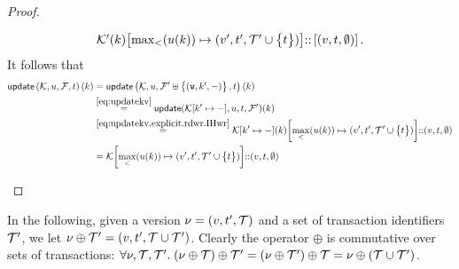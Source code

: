 \begin{proof}
\begin{enumerate}
\begin{itemize}
\begin{equation}
\begin{array}{l}
            \mkvs'(\key)\rmto{\max_{<}(\vi(\key))}{(\val', \txid', \txidset' \cup \Set{\txid})} \lcat \List{(\val, \txid, \emptyset)}.
            \end{array}
			\end{equation}
			It follows that 
            \begin{align*}
			    \updateKV[\mkvs, \vi, \fp, \txid](\key)
                & =
                \updateKV[\mkvs, \vi, \fp' \uplus \Set{(\otW, \key', \stub)}, \txid](\key) \\
                & \stackrel{\cref{eq:updatekv}}{=} 
			    \updateKV(\mkvs\rmto{\key'}{\stub}, \vi, \txid, \fp')(\key) \\
                & \stackrel{\cref{eq:updatekv.explicit.rdwr.IHwr}}{=}
                \mkvs\rmto{\key'}{\stub}(\key)\rmto{\max_{<}(\vi(\key))}{(\val', \txid', \txidset' \cup \Set{\txid})} \lcat (\val, \txid, \emptyset) \\
                & =
                \mkvs\rmto{\max_{<}(\vi(\key))}{(\val', \txid', \txidset' \cup \Set{\txid})} \lcat (\val, \txid, \emptyset)
            \end{align*}
			\end{itemize}
\end{enumerate}
\end{proof}

In the following, given a version $\nu = (v, t', \mathcal{T})$ and a set of 
transaction identifiers $\mathcal{T}'$, we let $\nu \oplus \mathcal{T}' = (v, t', \mathcal{T} \cup \mathcal{T}')$. 
Clearly the operator $\oplus$ is commutative over sets of transactions: 
$\forall \nu, \mathcal{T}, \mathcal{T}'.\; (\nu \oplus \mathcal{T}) \oplus \mathcal{T}' = (\nu \oplus \mathcal{T}') \oplus \mathcal{T} = 
\nu \oplus (\mathcal{T} \cup \mathcal{T}')$.

